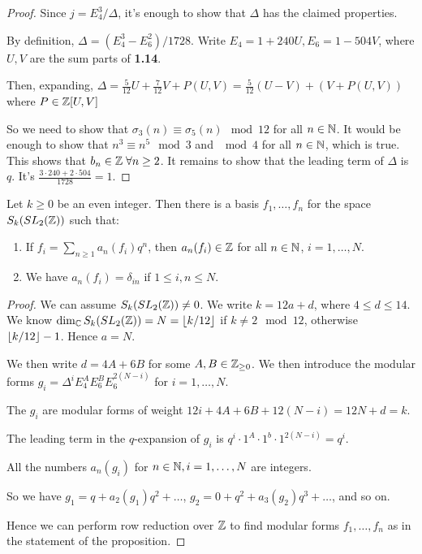 \documentclass[10pt,a4paper]{article}
\begin{document}
\begin{proof}
  Since $j = E_4^3/\Delta$, it's enough to show that $\Delta$ has the claimed properties.

  By definition, $\Delta = (E_4^3 - E_6^2)/1728$. Write $E_4 = 1+240 U, E_6 = 1-504 V$, where $U, V$ are the sum parts of \textbf{1.14}.

  Then, expanding, $\Delta = \frac{5}{12}U + \frac{7}{12}V + P(U,V) = \frac{5}{12}(U-V)+(V+P(U,V))$ where $P \in \mathbb{Z}[U,V]$

  So we need to show that $\sigma_3(n) \equiv \sigma_5(n) \mod 12$ for all $n \in \mathbb{N}$. It would be enough to show that $n^3 \equiv n^5 \mod 3$ and $\mod 4$ for all $n \in \mathbb{N}$, which is true. This shows that $b_n \in \Z \forall n \geq 2$. It remains to show that the leading term of $\Delta$ is $q$. It's $\frac{3\cdot 240 + 2\cdot 504}{1728} = 1$.
\end{proof}
\begin{proposition}
  Let $k \geq 0$ be an even integer. Then there is a basis $f_1, \ldots, f_n$ for the space $S_k(SL_2(\mathbb{Z}))$ such that:
  \begin{enumerate}[label=\alph*)]
    \item If $f_i = \sum_{n\geq 1} a_n (f_i)q^n$, then $a_n(f_i) \in \mathbb{Z}$ for all $n \in \mathbb{N}$, $i=1,\ldots, N$.
    \item We have $a_n(f_i) = \delta_{in}$ if $1 \leq i, n \leq N$.
  \end{enumerate}
\end{proposition}
\begin{proof}
  We can assume $S_k(SL_2(\mathbb{Z})) \neq 0$. We write $k=12a + d$, where $4 \leq d \leq 14$. We know $\dim_{\mathbb{C}} S_k(SL_2(\mathbb{Z})) = N = \lfloor k/12 \rfloor$ if $k \neq 2 \mod 12$, otherwise $\lfloor k/12 \rfloor-1$. Hence $a = N$.

  We then write $d = 4A+6B$ for some $A,B \in \mathbb{Z}_{\geq 0}$. We then introduce the modular forms $g_i = \Delta^i E_4^A E_6^B E_6^{2(N-i)}$ for $i =1, \ldots, N$.

  The $g_i$ are modular forms of weight $12i + 4A+6B + 12(N-i) = 12N+d = k$.

  The leading term in the $q$-expansion of $g_i$ is $q^i \cdot 1^A \cdot 1^b \cdot 1^{2(N-i)} = q^i$.

  All the numbers $a_n(g_i)$ for $n \in \mathbb{N}, i=1, \ldots, N$ are integers.

  So we have $g_1 = q + a_2(g_1)q^2 + \ldots$, $g_2 = 0+q^2 + a_3(g_2)q^3+\ldots$, and so on.

  Hence we can perform row reduction over $\mathbb{Z}$ to find modular forms $f_1, \ldots, f_n$ as in the statement of the proposition.
\end{proof}
\end{document}
